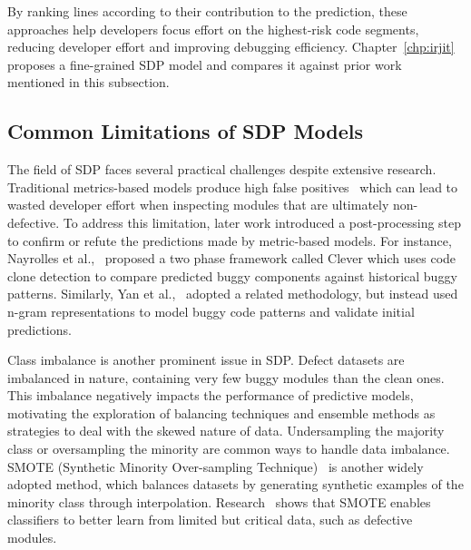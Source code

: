 \documentclass[\main/thesis.tex]{subfiles}
\begin{document}
By ranking lines according to their contribution to the prediction, these approaches help developers focus effort on the highest‑risk code segments, reducing developer effort and improving debugging efficiency. Chapter~\ref{chp:irjit} proposes a fine-grained SDP model and compares it against prior work~\cite{yan2020JIT, pornprasit2021jitline} mentioned in this subsection.



\subsection{Common Limitations of SDP Models}
The field of SDP faces several practical challenges despite extensive research. Traditional metrics-based models produce high false positives~\cite{clever} which can lead to wasted developer effort when inspecting modules that are ultimately non-defective. To address this limitation, later work introduced a post-processing step to confirm or refute the predictions made by metric-based models. For instance, Nayrolles et al.,~\cite{clever} proposed a two phase framework called Clever which uses code clone detection to compare predicted buggy components against historical buggy patterns. Similarly, Yan et al.,~\cite{yan2020JIT} adopted a related methodology, but instead used n-gram representations to model buggy code patterns and validate initial predictions.

Class imbalance is another prominent issue in SDP. Defect datasets are imbalanced in nature, containing very few buggy modules than the clean ones. This imbalance negatively impacts the performance of predictive models, motivating the exploration of balancing techniques\cite{tantithamthavorn2018impact} and ensemble methods\cite{laradji2015software} as strategies to deal with the skewed nature of data. Undersampling the majority class or oversampling the minority are common ways to handle data imbalance. SMOTE (Synthetic Minority Over-sampling Technique)~\cite{chawla2002smote} is another widely adopted method, which balances datasets by generating synthetic examples of the minority class through interpolation. Research~\cite{feng2021investigation} shows that SMOTE enables classifiers to better learn from limited but critical data, such as defective modules.
\end{document}
